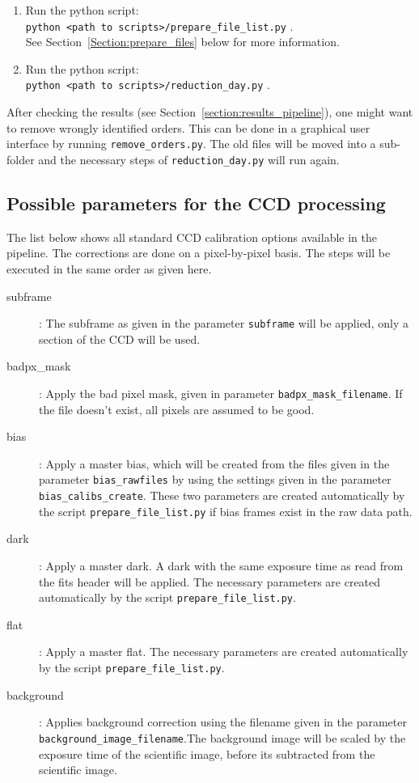 \documentclass[10pt,a4paper]{article}
\begin{document}
\begin{enumerate}
\begin{description}
  \end{description}
  \item Run the python script: \\ \verb|python <path to scripts>/prepare_file_list.py| . \\ See Section~\ref{Section:prepare_files} below for more information.
  \item Run the python script: \\ \verb|python <path to scripts>/reduction_day.py| .
\end{enumerate}

\noindent After checking the results (see Section~\ref{section:results_pipeline}), one might want to remove wrongly identified orders. This can be done in a graphical user interface by running \verb|remove_orders.py|. The old files will be moved into a sub-folder and the necessary steps of \verb|reduction_day.py| will run again.

\subsection{Possible parameters for the CCD processing}
\label{Section:parameters_CCD_proc}
\noindent The list below shows all standard CCD calibration options available in the pipeline. The corrections are done on a pixel-by-pixel basis. The steps will be executed in the same order as given here.
\begin{description}
  \item[subframe] : The subframe as given in the parameter \verb|subframe| will be applied, only a section of the CCD will be used.
  \item[badpx\_mask] : Apply the bad pixel mask, given in parameter \verb|badpx_mask_filename|. If the file doesn't exist, all pixels are assumed to be good.
  \item[bias] : Apply a master bias, which will be created from the files given in the parameter \verb|bias_rawfiles| by using the settings given in the parameter \verb|bias_calibs_create|. These two parameters are created automatically by the script \verb|prepare_file_list.py| if bias frames exist in the raw data path.
  \item[dark] : Apply a master dark. A dark with the same exposure time as read from the fits header will be applied. The necessary parameters are created automatically by the script \verb|prepare_file_list.py|.
  \item[flat] : Apply a master flat. The necessary parameters are created automatically by the script \verb|prepare_file_list.py|.
  \item[background] : Applies background correction using the filename given in the parameter \verb|background_image_filename|.The background image will be scaled by the exposure time of the scientific image, before its subtracted from the scientific image.
\end{description}
\end{document}

